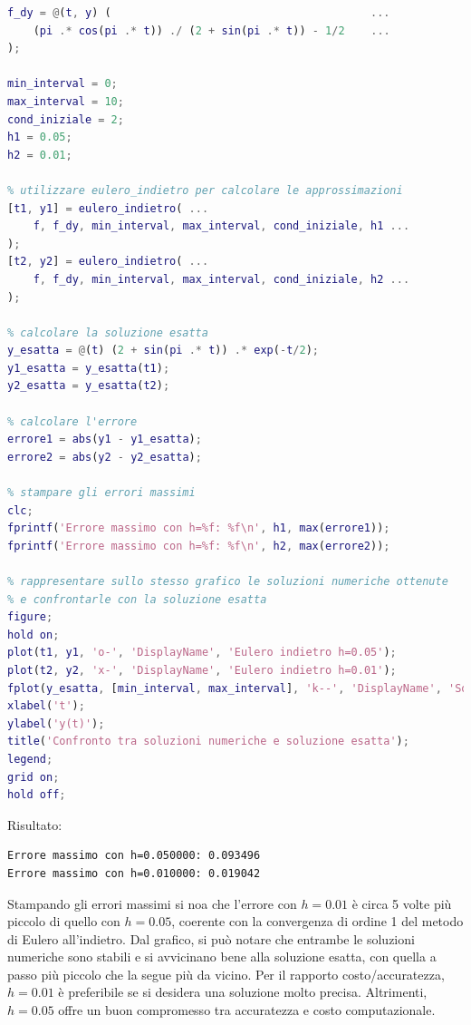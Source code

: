 \begin{enumerate}
\begin{lstlisting}[language=MATLAB]
% derivata prima di f rispetto a y
f_dy = @(t, y) (                                        ...
    (pi .* cos(pi .* t)) ./ (2 + sin(pi .* t)) - 1/2    ...
);

min_interval = 0;
max_interval = 10;
cond_iniziale = 2;
h1 = 0.05;
h2 = 0.01;

% utilizzare eulero_indietro per calcolare le approssimazioni
[t1, y1] = eulero_indietro( ...
    f, f_dy, min_interval, max_interval, cond_iniziale, h1 ...
);
[t2, y2] = eulero_indietro( ...
    f, f_dy, min_interval, max_interval, cond_iniziale, h2 ...
);

% calcolare la soluzione esatta
y_esatta = @(t) (2 + sin(pi .* t)) .* exp(-t/2);
y1_esatta = y_esatta(t1);
y2_esatta = y_esatta(t2);

% calcolare l'errore
errore1 = abs(y1 - y1_esatta);
errore2 = abs(y2 - y2_esatta);

% stampare gli errori massimi
clc;
fprintf('Errore massimo con h=%f: %f\n', h1, max(errore1));
fprintf('Errore massimo con h=%f: %f\n', h2, max(errore2));

% rappresentare sullo stesso grafico le soluzioni numeriche ottenute
% e confrontarle con la soluzione esatta
figure;
hold on;
plot(t1, y1, 'o-', 'DisplayName', 'Eulero indietro h=0.05');
plot(t2, y2, 'x-', 'DisplayName', 'Eulero indietro h=0.01');
fplot(y_esatta, [min_interval, max_interval], 'k--', 'DisplayName', 'Soluzione esatta');
xlabel('t');
ylabel('y(t)');
title('Confronto tra soluzioni numeriche e soluzione esatta');
legend;
grid on;
hold off;\end{lstlisting}
    Risultato:
    \begin{lstlisting}
Errore massimo con h=0.050000: 0.093496
Errore massimo con h=0.010000: 0.019042\end{lstlisting}
    Stampando gli errori massimi si noa che l'errore con $h=0.01$ è circa 5 volte più piccolo di quello con $h=0.05$, coerente con la convergenza di ordine 1 del metodo di Eulero all'indietro. Dal grafico, si può notare che entrambe le soluzioni numeriche sono stabili e si avvicinano bene alla soluzione esatta, con quella a passo più piccolo che la segue più da vicino. Per il rapporto costo/accuratezza, $h=0.01$ è preferibile se si desidera una soluzione molto precisa. Altrimenti, $h=0.05$ offre un buon compromesso tra accuratezza e costo computazionale.

    \newpage


\end{enumerate}
